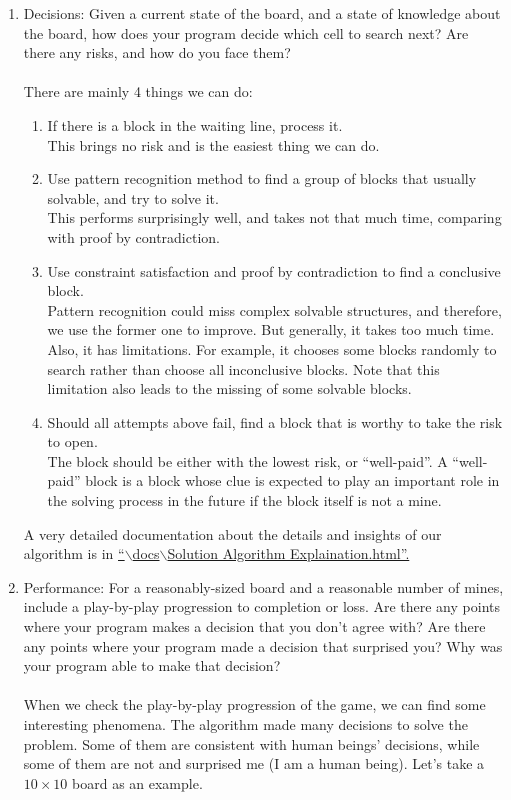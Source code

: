 \documentclass[letter]{article}
\begin{document}
\begin{enumerate}
	\item {Decisions: Given a current state of the board, and a state of knowledge about the board, how does your program decide which cell to search next? Are there any risks, and how do you face them?} \\
	\\
	There are mainly 4 things we can do:
	\begin{enumerate}
		\item {If there is a block in the waiting line, process it. \\ This brings no risk and is the easiest thing we can do.}
		\item {Use pattern recognition method to find a group of blocks that usually solvable, and try to solve it. \\ This performs surprisingly well, and takes not that much time, comparing with proof by contradiction.}
		\item {Use constraint satisfaction and proof by contradiction to find a conclusive block. \\ Pattern recognition could miss complex solvable structures, and therefore, we use the former one to improve. But generally, it takes too much time. Also, it has limitations. For example, it chooses some blocks randomly to search rather than choose all inconclusive blocks. Note that this limitation also leads to the missing of some solvable blocks.}
		\item {Should all attempts above fail, find a block that is worthy to take the risk to open. \\ The block should be either with the lowest risk, or ``well-paid''. A ``well-paid'' block is a block whose clue is expected to play an important role in the solving process in the future if the block itself is not a mine.}
	\end{enumerate}
	A very detailed documentation about the details and insights of our algorithm is in \href{run:Solution Algorithm Explaination.html}{``$ \backslash $docs$ \backslash $Solution Algorithm Explaination.html''.} \\
	
	\label{han}
	\item {Performance: For a reasonably-sized board and a reasonable number of mines, include a play-by-play progression to completion or loss. Are there any points where your program makes a decision that you don’t agree with? Are there any points where your program made a decision that surprised you? Why was your program able to make that decision?} \\
	\\
	When we check the play-by-play progression of the game, we can find some interesting phenomena. The algorithm made many decisions to solve the problem. Some of them are consistent with human beings’ decisions, while some of them are not and surprised me (I am a human being). Let’s take a $ 10 \times 10 $ board as an example.
	

\end{enumerate}
\end{document}
